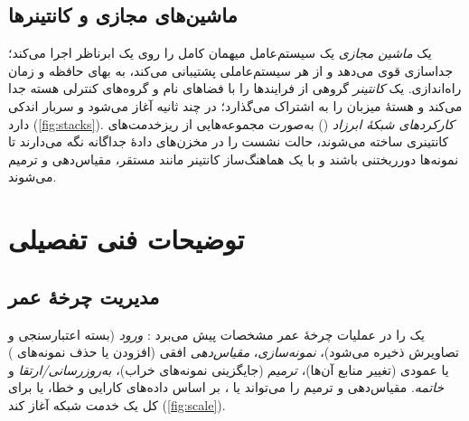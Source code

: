\documentclass[11pt,a4paper]{article}
\begin{document}
\subsection{ماشین‌های مجازی و کانتینرها}
یک \emph{ماشین مجازی} یک سیستم‌عامل میهمان کامل را روی یک ابرناظر اجرا می‌کند؛ جداسازی قوی می‌دهد و از هر سیستم‌عاملی
پشتیبانی می‌کند، به بهای حافظه و زمان راه‌اندازی. یک \emph{کانتینر} گروهی از فرایندها را با فضاهای نام و گروه‌های کنترلی
هسته جدا می‌کند و هستهٔ میزبان را به اشتراک می‌گذارد؛ در چند ثانیه آغاز می‌شود و سربار اندکی دارد (\cref{fig:stacks}).
\emph{کارکردهای شبکهٔ ابرزاد} () به‌صورت مجموعه‌هایی از ریزخدمت‌های کانتینری ساخته می‌شوند، حالت نشست را در
مخزن‌های دادهٔ جداگانه نگه می‌دارند تا نمونه‌ها دورریختنی باشند و با یک هماهنگ‌ساز کانتینر مانند  مستقر،
مقیاس‌دهی و ترمیم می‌شوند.

\begin{acnfigure}
  \caption{از دستگاه‌های اختصاصی تا ماشین‌های مجازی و کانتینرها.}
  \label{fig:stacks}
\end{acnfigure}

\section{توضیحات فنی تفصیلی}

\subsection{مدیریت چرخهٔ عمر}
 یک  را در عملیات چرخهٔ عمر مشخصات  پیش می‌برد \cite{etsinfvman001}: \emph{ورود} (بسته
اعتبارسنجی و تصاویرش ذخیره می‌شود)، \emph{نمونه‌سازی}، \emph{مقیاس‌دهی} افقی (افزودن یا حذف نمونه‌های ) یا
عمودی (تغییر منابع آن‌ها)، \emph{ترمیم} (جایگزینی نمونه‌های خراب)، \emph{به‌روزرسانی/ارتقا} و \emph{خاتمه}. مقیاس‌دهی و ترمیم
را می‌تواند  یا ،  بر اساس داده‌های کارایی و خطا، یا  برای کل یک خدمت شبکه آغاز
کند (\cref{fig:scale}).
\end{document}
